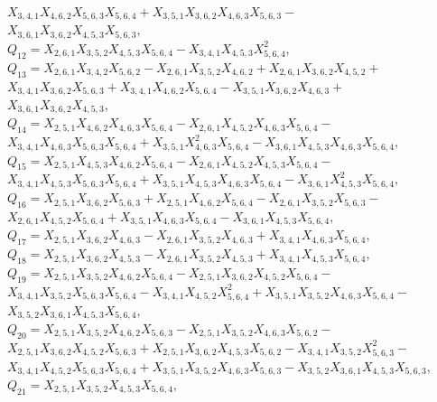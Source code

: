 \documentclass[10pt]{beamer}
\begin{document}
{$X_{3,4,1}X_{4,6,2}X_{5,6,3}X_{5,6,4}+X_{3,5,1}X_{3,6,2}X_{4,6,3}X_{5,6,3}-$\\
$X_{3,6,1}X_{3,6,2}X_{4,5,3}X_{5,6,3},$\\
$Q_{12}=X_{2,6,1}X_{3,5,2}X_{4,5,3}X_{5,6,4}-X_{3,4,1}X_{4,5,3}X_{5,6,4}^2,$\\
$Q_{13}=X_{2,6,1}X_{3,4,2}X_{5,6,2}-X_{2,6,1}X_{3,5,2}X_{4,6,2}+X_{2,6,1}X_{3,6,2}X_{4,5,2}+$\\
$X_{3,4,1}X_{3,6,2}X_{5,6,3}+X_{3,4,1}X_{4,6,2}X_{5,6,4}-X_{3,5,1}X_{3,6,2}X_{4,6,3}+$\\
$X_{3,6,1}X_{3,6,2}X_{4,5,3},$\\
$Q_{14}=X_{2,5,1}X_{4,6,2}X_{4,6,3}X_{5,6,4}-X_{2,6,1}X_{4,5,2}X_{4,6,3}X_{5,6,4}-$\\
$X_{3,4,1}X_{4,6,3}X_{5,6,3}X_{5,6,4}+X_{3,5,1}X_{4,6,3}^2X_{5,6,4}-X_{3,6,1}X_{4,5,3}X_{4,6,3}X_{5,6,4},$\\
$Q_{15}=X_{2,5,1}X_{4,5,3}X_{4,6,2}X_{5,6,4}-X_{2,6,1}X_{4,5,2}X_{4,5,3}X_{5,6,4}-$\\
$X_{3,4,1}X_{4,5,3}X_{5,6,3}X_{5,6,4}+X_{3,5,1}X_{4,5,3}X_{4,6,3}X_{5,6,4}-X_{3,6,1}X_{4,5,3}^2X_{5,6,4},$\\
$Q_{16}=X_{2,5,1}X_{3,6,2}X_{5,6,3}+X_{2,5,1}X_{4,6,2}X_{5,6,4}-X_{2,6,1}X_{3,5,2}X_{5,6,3}-$\\
$X_{2,6,1}X_{4,5,2}X_{5,6,4}+X_{3,5,1}X_{4,6,3}X_{5,6,4}-X_{3,6,1}X_{4,5,3}X_{5,6,4},$\\
$Q_{17}=X_{2,5,1}X_{3,6,2}X_{4,6,3}-X_{2,6,1}X_{3,5,2}X_{4,6,3}+X_{3,4,1}X_{4,6,3}X_{5,6,4},$\\
$Q_{18}=X_{2,5,1}X_{3,6,2}X_{4,5,3}-X_{2,6,1}X_{3,5,2}X_{4,5,3}+X_{3,4,1}X_{4,5,3}X_{5,6,4},$\\
$Q_{19}=X_{2,5,1}X_{3,5,2}X_{4,6,2}X_{5,6,4}-X_{2,5,1}X_{3,6,2}X_{4,5,2}X_{5,6,4}-$\\
$X_{3,4,1}X_{3,5,2}X_{5,6,3}X_{5,6,4}-X_{3,4,1}X_{4,5,2}X_{5,6,4}^2+X_{3,5,1}X_{3,5,2}X_{4,6,3}X_{5,6,4}-$\\
$X_{3,5,2}X_{3,6,1}X_{4,5,3}X_{5,6,4},$\\
$Q_{20}=X_{2,5,1}X_{3,5,2}X_{4,6,2}X_{5,6,3}-X_{2,5,1}X_{3,5,2}X_{4,6,3}X_{5,6,2}-$\\
$X_{2,5,1}X_{3,6,2}X_{4,5,2}X_{5,6,3}+X_{2,5,1}X_{3,6,2}X_{4,5,3}X_{5,6,2}-X_{3,4,1}X_{3,5,2}X_{5,6,3}^2-$\\
$X_{3,4,1}X_{4,5,2}X_{5,6,3}X_{5,6,4}+X_{3,5,1}X_{3,5,2}X_{4,6,3}X_{5,6,3}-X_{3,5,2}X_{3,6,1}X_{4,5,3}X_{5,6,3},$\\
$Q_{21}=X_{2,5,1}X_{3,5,2}X_{4,5,3}X_{5,6,4},$\\
}
\end{document}

